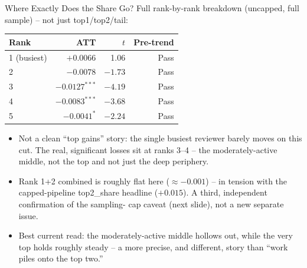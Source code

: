 \begin{frame}{Where Exactly Does the Share Go?}
Full rank-by-rank breakdown (uncapped, full sample) -- not just
top1/top2/tail:
\begin{table}
\centering
\small
\begin{tabular}{lrrr}
\toprule
Rank & ATT & $t$ & Pre-trend \\
\midrule
1 (busiest) & $+0.0066$ & 1.06  & Pass \\
2            & $-0.0078$ & $-1.73$ & Pass \\
3            & $-0.0127^{***}$ & $-4.19$ & Pass \\
4            & $-0.0083^{***}$ & $-3.68$ & Pass \\
5            & $-0.0041^{*}$  & $-2.24$ & Pass \\
\bottomrule
\end{tabular}
\end{table}
\begin{itemize}
  \item Not a clean ``top gains'' story: the single busiest reviewer
        barely moves on this cut. The real, significant losses sit at
        ranks 3--4 -- the moderately-active middle, not the top and
        not just the deep periphery.
  \item Rank 1+2 combined is roughly flat here ($\approx -0.001$) --
        in tension with the capped-pipeline top2\_share headline
        ($+0.015$). A third, independent confirmation of the sampling-
        cap caveat (next slide), not a new separate issue.
  \item Best current read: the moderately-active middle hollows out,
        while the very top holds roughly steady -- a more precise, and
        different, story than ``work piles onto the top two.''
\end{itemize}
\end{frame}

